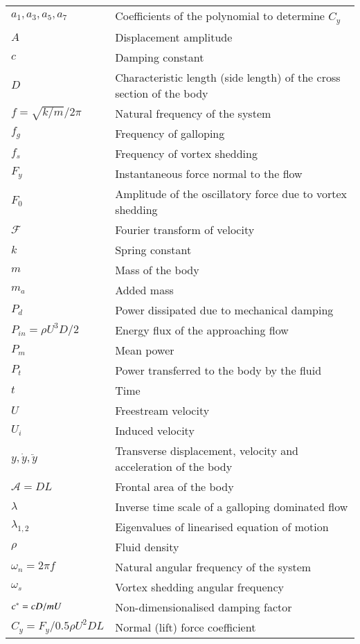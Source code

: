 \begin{longtable}{p{}p{}}
$a_1,a_3,a_5,a_7$ & Coefficients of the polynomial to determine $C_y$ \\ 
$A$ & Displacement amplitude\\
$c$ & Damping constant \\
$D$ & Characteristic length (side length) of the cross section of the body \\
$f=\sqrt{k/m}/2\pi$ & Natural frequency of the system \\
$f_g$ & Frequency of galloping \\
$f_s$ & Frequency of vortex shedding \\
$F_y$ & Instantaneous force normal to the flow \\ 
$F_0$& Amplitude of the oscillatory force due to vortex shedding \\
$\mathcal{F}$&  Fourier transform of velocity \\
$k$ & Spring constant \\
$m$ & Mass of the body \\
$m_a$ & Added mass \\
$P_d$ & Power dissipated due to mechanical damping  \\
$P_{in}=\rho U^3D/2$ & Energy flux of the approaching flow \\
$P_{m}$ & Mean power \\
$P_t$   & Power transferred to the body by the fluid \\
$t$ & Time \\
$U$ & Freestream velocity \\
$U_i$ & Induced velocity \\
$y,\dot{y},\ddot{y}$ & Transverse displacement, velocity and acceleration of the body \\
$\mathcal{A}=DL$ & Frontal area of the body\\ 
$\lambda$ & Inverse time scale of a galloping dominated flow \\
$\lambda_{1,2}$ & Eigenvalues of linearised equation of motion \\
$\rho$ & Fluid density  \\
$\omega_n= 2 \pi f$ & Natural angular frequency of the system  \\
$\omega_s$ & Vortex shedding angular frequency \\
$c^{*}=cD/mU$ & Non-dimensionalised damping factor \\
$C_y=F_y/0.5\rho U^2DL$ & Normal (lift) force coefficient \\

\end{longtable}
